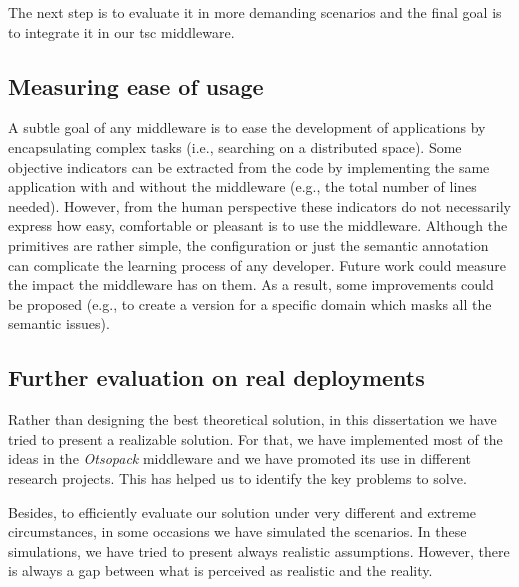 The next step is to evaluate it in more demanding scenarios and the final goal is to integrate it in our \ac{tsc} middleware.




\subsection{Measuring ease of usage}

A subtle goal of any middleware is to ease the development of applications by encapsulating complex tasks (i.e., searching on a distributed space).
Some objective indicators can be extracted from the code by implementing the same application with and without the middleware (e.g., the total number of lines needed).
However, from the human perspective these indicators do not necessarily express how easy, comfortable or pleasant is to use the middleware.
Although the primitives are rather simple, the configuration or just the semantic annotation can complicate the learning process of any developer.
Future work could measure the impact the middleware has on them.
As a result, some improvements could be proposed (e.g., to create a version for a specific domain which masks all the semantic issues).


\subsection{Further evaluation on real deployments}

Rather than designing the best theoretical solution, in this dissertation we have tried to present a realizable solution.
For that, we have implemented most of the ideas in the \emph{Otsopack} middleware and we have promoted its use in different research projects.
This has helped us to identify the key problems to solve.

Besides, to efficiently evaluate our solution under very different and extreme circumstances, in some occasions we have simulated the scenarios. %
In these simulations, we have tried to present always realistic assumptions.
However, there is always a gap between what is perceived as realistic and the reality.

